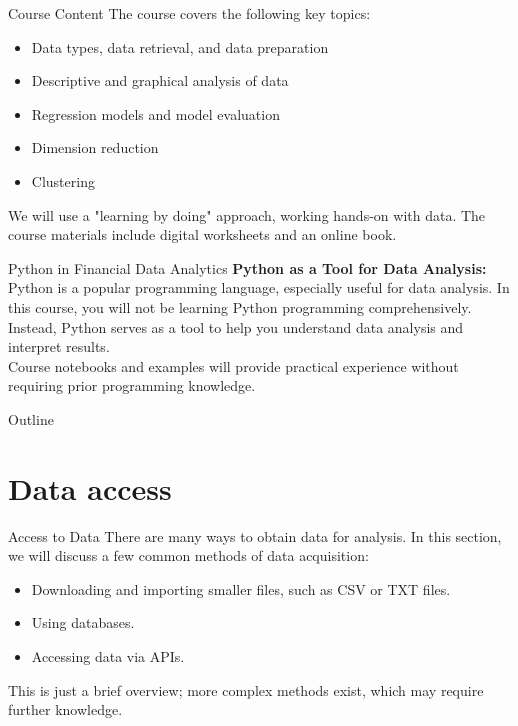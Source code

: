 \documentclass{beamer}
\begin{document}
	\begin{frame}{Course Content}
		The course covers the following key topics:
		\begin{itemize}
			\item Data types, data retrieval, and data preparation
			\item Descriptive and graphical analysis of data
			\item Regression models and model evaluation
			\item Dimension reduction
			\item Clustering
		\end{itemize}
		\vspace{0.5cm}
		We will use a "learning by doing" approach, working hands-on with data. The course materials include digital worksheets and an online book.
	\end{frame}
	
	\begin{frame}{Python in Financial Data Analytics}
		\textbf{Python as a Tool for Data Analysis:} \\
		\vspace{0.5cm}
		Python is a popular programming language, especially useful for data analysis. In this course, you will not be learning Python programming comprehensively. Instead, Python serves as a tool to help you understand data analysis and interpret results. \\
		\vspace{0.5cm}
		Course notebooks and examples will provide practical experience without requiring prior programming knowledge.
	\end{frame}
	
	\begin{frame}{Outline}
		\tableofcontents
	\end{frame}
	
	\section{Data access}
	\begin{frame}{Access to Data}
		There are many ways to obtain data for analysis. In this section, we will discuss a few common methods of data acquisition:
		\begin{itemize}
			\item Downloading and importing smaller files, such as CSV or TXT files.
			\item Using databases.
			\item Accessing data via APIs.
		\end{itemize}
		\vspace{0.5cm}
		This is just a brief overview; more complex methods exist, which may require further knowledge.
	\end{frame}
	
\end{document}
